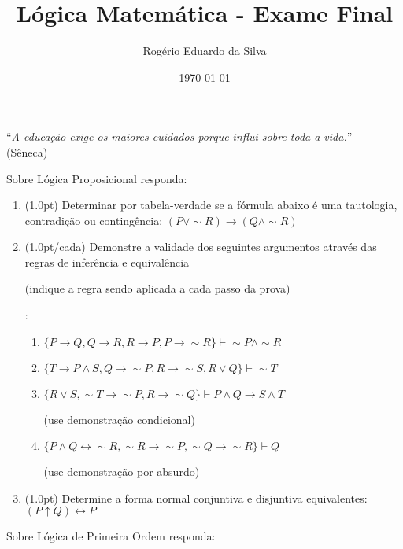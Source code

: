 \documentclass[12pt]{article}
\title{Lógica Matemática - Exame Final}
\author{Rogério Eduardo da Silva}
\date{\today}
\begin{document}
\maketitle
\begin{flushright}
``\textit{A educação exige os maiores cuidados porque influi sobre toda a vida.}''\\ (Sêneca)
\end{flushright}

\small
Sobre Lógica Proposicional responda:
\begin{enumerate}
\item (1.0pt) Determinar por tabela-verdade se a fórmula abaixo é uma tautologia, contradição ou contingência: $(P \vee \sim R) \rightarrow (Q \wedge \sim R)$

\item (1.0pt/cada) Demonstre a validade dos seguintes argumentos através das regras de inferência e equivalência \begin{scriptsize}(indique a regra sendo aplicada a cada passo da prova)\end{scriptsize}:
\begin{enumerate}
\item $\{ P\rightarrow Q, Q \rightarrow R, R \rightarrow P, P \rightarrow\sim R \}\vdash \sim P \wedge\sim R$
\item $\{ T\rightarrow P\wedge S, Q\rightarrow\sim P, R \rightarrow\sim S, R \vee Q \}\vdash \sim T$
\item $\{ R\vee S, \sim T\rightarrow\sim P, R\rightarrow\sim Q \}\vdash P\wedge Q\rightarrow S\wedge T$
\begin{scriptsize}(use demonstração condicional)\end{scriptsize}
\item $\{ P \wedge Q \leftrightarrow\sim R, \sim R\rightarrow\sim P, \sim Q \rightarrow\sim R \}\vdash Q$ \begin{scriptsize}(use demonstração por absurdo)\end{scriptsize}
\end{enumerate}

\item (1.0pt) Determine a forma normal conjuntiva e disjuntiva equivalentes: $(P \uparrow Q)\leftrightarrow P $
\end{enumerate}

Sobre Lógica de Primeira Ordem responda:
\end{document}
